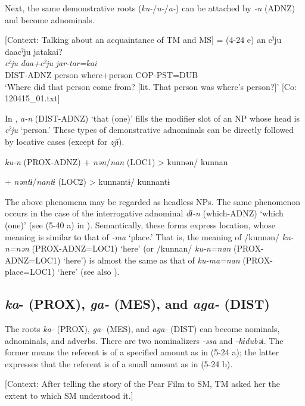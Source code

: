 Next, the same demonstrative roots (\textit{ku-}/\textit{u-}/\textit{a-}) can be attached by \textit{{}-n} (ADNZ) and become adnominals.

\ea \label{ex:5:22}   [Context: Talking about an acquaintance of TM and MS] = (4-24 e)
\glll  an  cˀju  daacˀju  jatakai?\\
\textit{}  \textit{cˀju}  \textit{daa+cˀju}  \textit{jar-tar=kai}\\
DIST-ADNZ  person  where+person  COP-PST=DUB\\
\glt ‘Where did that person come from? [lit. That person was where’s person?]’ [Co: 120415\_01.txt]
\z

In , \textit{a-n} (DIST-ADNZ) ‘that (one)’ fills the modifier slot of an NP whose head is \textit{cˀju} ‘person.’ These types of demonstrative adnominals can be directly followed by locative cases (except for \textit{zjɨ}).

\ea \label{ex:5:23}   \textit{ku-n}  (PROX-ADNZ)  +  \textit{nən}/\textit{nan}  (LOC1)  >  kunnən/ kunnan

      +  \textit{nəntɨ}/\textit{nantɨ}  (LOC2)  >  kunnəntɨ/ kunnantɨ
\z

The above phenomena may be regarded as headless NPs. The same phenomenon occurs in the case of the interrogative adnominal \textit{dɨ-n} (which-ADNZ) ‘which (one)’ (see (5-40 a) in ). Semantically, these forms express location, whose meaning is similar to that of \textit{{}-ma} ‘place.’ That is, the meaning of /kunnən/ \textit{ku-n=nən} (PROX-ADNZ=LOC1) ‘here’ (or /kunnan/ \textit{ku-n=nan} (PROX-ADNZ=LOC1) ‘here’) is almost the same as that of \textit{ku-ma=nan} (PROX-place=LOC1) ‘here’ (see also ).

\subsection{\textit{ka}{}- (PROX), \textit{ga-} (MES), and \textit{aga-} (DIST)}

The roots \textit{ka-} (PROX), \textit{ga-} (MES), and \textit{aga-} (DIST) can become nominals, adnominals, and adverbs. There are two nominalizers \textit{{}-ssa} and \textit{{}-hɨdubə}i. The former means the referent is of a specified amount as in (5-24 a); the latter expresses that the referent is of a small amount as in (5-24 b).

\ea \label{ex:5:24}  \ea \label{ex:5:24a} [Context: After telling the story of the Pear Film to SM, TM asked her the extent to which SM understood it.]

